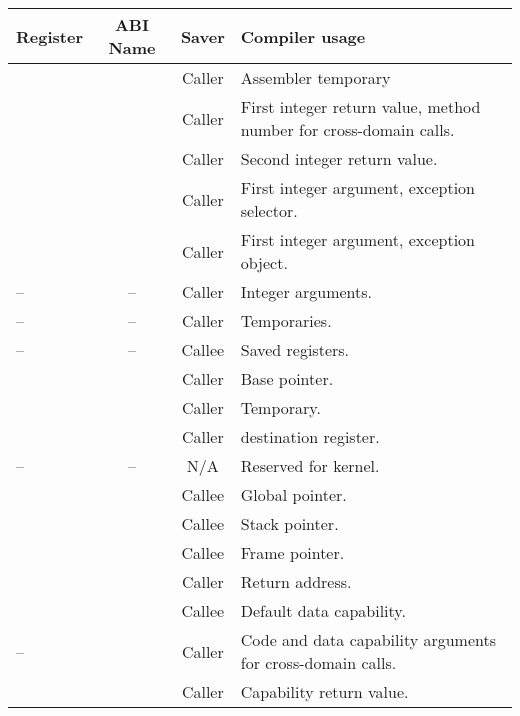\begin{table}
	\begin{center}
		\begin{tabu}{lccX}
			\toprule
			\headerrow
			Register             & ABI Name            & Saver  & Compiler usage \\
			\midrule
			              &             & Caller & Assembler temporary\\
			              &             & Caller & First integer return value, method number for cross-domain calls.\\
			              &             & Caller & Second integer return value.\\
			              &             & Caller & First integer argument, exception selector.\\
			              &             & Caller & First integer argument, exception object.\\
			--    & --  & Caller & Integer arguments.\\
			--    & --  & Caller & Temporaries.\\
			--   & --  & Callee & Saved registers.\\
			             &             & Caller & Base pointer.\\
			             &             & Caller & Temporary.\\
			             &             & Caller &  destination register.\\
			--   & --& N/A    & Reserved for kernel.\\
			             &             & Callee & Global pointer.\\
			             &             & Callee & Stack pointer.\\
			             &             & Callee & Frame pointer.\\
			             &             & Caller & Return address.\\
			\midrule
			             &                     & Callee & Default data capability.\\
			--   &                     & Caller & Code and data capability arguments for cross-domain calls. \\
			             &                     & Caller & Capability return value. \\

\end{tabu}
\end{center}
\end{table}
